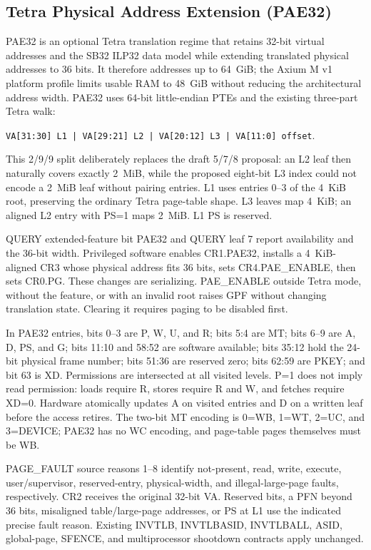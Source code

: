 \documentclass[11pt]{article}
\begin{document}
\subsection{Tetra Physical Address Extension (PAE32)}

PAE32 is an optional Tetra translation regime that retains 32-bit virtual
addresses and the SB32 ILP32 data model while extending translated physical
addresses to 36 bits. It therefore addresses up to 64~GiB; the Axium M v1
platform profile limits usable RAM to 48~GiB without reducing the architectural
address width. PAE32 uses 64-bit little-endian PTEs and the existing three-part
Tetra walk:

\begin{center}
\texttt{VA[31:30] L1 | VA[29:21] L2 | VA[20:12] L3 | VA[11:0] offset}.
\end{center}

This 2/9/9 split deliberately replaces the draft 5/7/8 proposal: an L2 leaf
then naturally covers exactly 2~MiB, while the proposed eight-bit L3 index
could not encode a 2~MiB leaf without pairing entries. L1 uses entries 0--3 of
the 4~KiB root, preserving the ordinary Tetra page-table shape. L3 leaves map
4~KiB; an aligned L2 entry with PS=1 maps 2~MiB. L1 PS is reserved.

QUERY extended-feature bit PAE32 and QUERY leaf 7 report availability and the
36-bit width. Privileged software enables CR1.PAE32, installs a 4~KiB-aligned
CR3 whose physical address fits 36 bits, sets CR4.PAE\_ENABLE, then sets
CR0.PG. These changes are serializing. PAE\_ENABLE outside Tetra mode, without
the feature, or with an invalid root raises GPF without changing translation
state. Clearing it requires paging to be disabled first.

In PAE32 entries, bits 0--3 are P, W, U, and R; bits 5:4 are MT; bits 6--9 are
A, D, PS, and G; bits 11:10 and 58:52 are software available; bits 35:12 hold
the 24-bit physical frame number; bits 51:36 are reserved zero; bits 62:59 are
PKEY; and bit 63 is XD. Permissions are intersected at all visited levels.
P=1 does not imply read permission: loads require R, stores require R and W,
and fetches require XD=0. Hardware atomically updates A on visited entries and
D on a written leaf before the access retires.
The two-bit MT encoding is 0=WB, 1=WT, 2=UC, and 3=DEVICE; PAE32 has no WC
encoding, and page-table pages themselves must be WB.

PAGE\_FAULT source reasons 1--8 identify not-present, read, write, execute,
user/supervisor, reserved-entry, physical-width, and illegal-large-page faults,
respectively. CR2 receives the original 32-bit VA. Reserved bits, a PFN beyond
36 bits, misaligned table/large-page addresses, or PS at L1 use the indicated
precise fault reason. Existing INVTLB, INVTLBASID, INVTLBALL, ASID, global-page,
SFENCE, and multiprocessor shootdown contracts apply unchanged.
\end{document}
